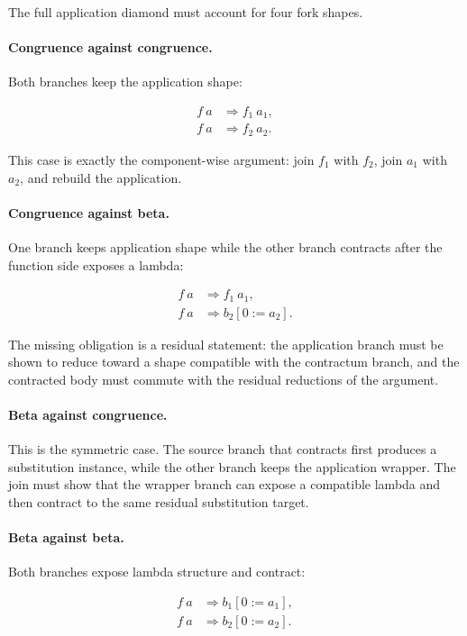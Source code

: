 The full application diamond must account for four fork shapes.

\paragraph{Congruence against congruence.}
Both branches keep the application shape:

$$
\begin{aligned}
f\ a &\Rightarrow f_1\ a_1,\\
f\ a &\Rightarrow f_2\ a_2.
\end{aligned}
$$

This case is exactly the component-wise argument: join $f_1$ with $f_2$, join
$a_1$ with $a_2$, and rebuild the application.

\paragraph{Congruence against beta.}
One branch keeps application shape while the other branch contracts after the
function side exposes a lambda:

$$
\begin{aligned}
f\ a &\Rightarrow f_1\ a_1,\\
f\ a &\Rightarrow b_2[0 := a_2].
\end{aligned}
$$

The missing obligation is a residual statement: the application branch must be
shown to reduce toward a shape compatible with the contractum branch, and the
contracted body must commute with the residual reductions of the argument.

\paragraph{Beta against congruence.}
This is the symmetric case. The source branch that contracts first produces a
substitution instance, while the other branch keeps the application wrapper.
The join must show that the wrapper branch can expose a compatible lambda and
then contract to the same residual substitution target.

\paragraph{Beta against beta.}
Both branches expose lambda structure and contract:

$$
\begin{aligned}
f\ a &\Rightarrow b_1[0 := a_1],\\
f\ a &\Rightarrow b_2[0 := a_2].
\end{aligned}
$$

